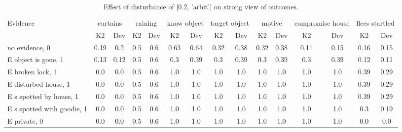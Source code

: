\begin{table}\begin{tabular}{l|cc|cc|cc|cc|cc|cc|cc}\toprule\multirow{2}{*}{Evidence} & \multicolumn{2}{c}{curtains}& \multicolumn{2}{c}{raining}& \multicolumn{2}{c}{know object}& \multicolumn{2}{c}{target object}& \multicolumn{2}{c}{motive}& \multicolumn{2}{c}{compromise house}& \multicolumn{2}{c}{flees startled}\\& {K2} & {Dev}& {K2} & {Dev}& {K2} & {Dev}& {K2} & {Dev}& {K2} & {Dev}& {K2} & {Dev}& {K2} & {Dev}\\\midrule
no evidence, 0 & 0.19&0.2&\cellcolor{Bittersweet}0.5&\cellcolor{Bittersweet}0.6&0.63&0.64&\cellcolor{Bittersweet}0.32&\cellcolor{Bittersweet}0.38&\cellcolor{Bittersweet}0.32&\cellcolor{Bittersweet}0.38&0.11&0.15&0.16&0.15\\E object is gone, 1 & 0.13&0.12&\cellcolor{Bittersweet}0.5&\cellcolor{Bittersweet}0.6&\cellcolor{Bittersweet}0.3&\cellcolor{Bittersweet}0.39&\cellcolor{Bittersweet}0.3&\cellcolor{Bittersweet}0.39&\cellcolor{Bittersweet}0.3&\cellcolor{Bittersweet}0.39&\cellcolor{Bittersweet}0.3&\cellcolor{Bittersweet}0.39&0.12&0.11\\E broken lock, 1 & 0.0&0.0&\cellcolor{Bittersweet}0.5&\cellcolor{Bittersweet}0.6&1.0&1.0&1.0&1.0&1.0&1.0&1.0&1.0&\cellcolor{Bittersweet}0.39&\cellcolor{Bittersweet}0.29\\E disturbed house, 1 & 0.0&0.0&\cellcolor{Bittersweet}0.5&\cellcolor{Bittersweet}0.6&1.0&1.0&1.0&1.0&1.0&1.0&1.0&1.0&\cellcolor{Bittersweet}0.39&\cellcolor{Bittersweet}0.29\\E s spotted by house, 1 & 0.0&0.0&\cellcolor{Bittersweet}0.5&\cellcolor{Bittersweet}0.6&1.0&1.0&1.0&1.0&1.0&1.0&1.0&1.0&\cellcolor{Bittersweet}0.39&\cellcolor{Bittersweet}0.29\\E s spotted with goodie, 1 & 0.0&0.0&\cellcolor{Bittersweet}0.5&\cellcolor{Bittersweet}0.6&1.0&1.0&1.0&1.0&1.0&1.0&1.0&1.0&\cellcolor{Bittersweet}0.3&\cellcolor{Bittersweet}0.19\\E private, 0 & 0.0&0.0&\cellcolor{Bittersweet}0.5&\cellcolor{Bittersweet}0.6&1.0&1.0&1.0&1.0&1.0&1.0&1.0&1.0&0.0&0.0\\\bottomrule\end{tabular}\caption{Effect of disturbance of [0.2, 'arbit'] on strong view of outcomes.}\end{table}